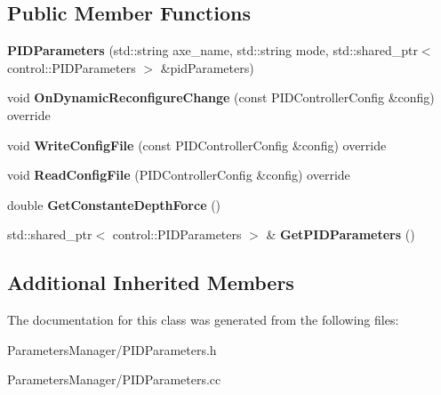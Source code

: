\subsection*{Public Member Functions}
\begin{DoxyCompactItemize}
\item 
\mbox{\label{classproc__control_1_1_p_i_d_parameters_a3441450a67dbc26fbb2c2db1b47c035e}} 
{\bfseries P\+I\+D\+Parameters} (std\+::string axe\+\_\+name, std\+::string mode, std\+::shared\+\_\+ptr$<$ control\+::\+P\+I\+D\+Parameters $>$ \&pid\+Parameters)
\item 
\mbox{\label{classproc__control_1_1_p_i_d_parameters_a5e1bf35f716a3b7c734b7e596dd72810}} 
void {\bfseries On\+Dynamic\+Reconfigure\+Change} (const P\+I\+D\+Controller\+Config \&config) override
\item 
\mbox{\label{classproc__control_1_1_p_i_d_parameters_a3dbcf89841eec59edd9b9e47fcc71273}} 
void {\bfseries Write\+Config\+File} (const P\+I\+D\+Controller\+Config \&config) override
\item 
\mbox{\label{classproc__control_1_1_p_i_d_parameters_aeaebb55d9aebec7a576121258241fe0e}} 
void {\bfseries Read\+Config\+File} (P\+I\+D\+Controller\+Config \&config) override
\item 
\mbox{\label{classproc__control_1_1_p_i_d_parameters_aea85a45d3a5a1b8ef7f65b4e354dbf07}} 
double {\bfseries Get\+Constante\+Depth\+Force} ()
\item 
\mbox{\label{classproc__control_1_1_p_i_d_parameters_a894c72328645382879c55a83d597db5d}} 
std\+::shared\+\_\+ptr$<$ control\+::\+P\+I\+D\+Parameters $>$ \& {\bfseries Get\+P\+I\+D\+Parameters} ()
\end{DoxyCompactItemize}
\subsection*{Additional Inherited Members}


The documentation for this class was generated from the following files\+:\begin{DoxyCompactItemize}
\item 
Parameters\+Manager/P\+I\+D\+Parameters.\+h\item 
Parameters\+Manager/P\+I\+D\+Parameters.\+cc\end{DoxyCompactItemize}

